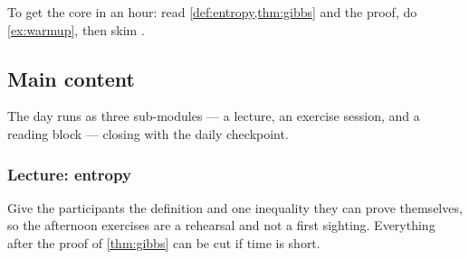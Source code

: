 \documentclass[11pt]{article}
\begin{document}
To get the core in an hour: read \cref{def:entropy,thm:gibbs} and the proof,
do \cref{ex:warmup}, then skim \cite[ch.~4]{MacKay:03}.

\subsection{Main content}
\label{sec:main}
%

The day runs as three sub-modules — a lecture, an exercise session, and a
reading block — closing with the daily checkpoint.

\subsubsection{Lecture: entropy}
\label{sec:lecture}

\begin{teachingnote}[Intent]
Give the participants the definition and one inequality they can prove
themselves, so the afternoon exercises are a rehearsal and not a first
sighting. Everything after the proof of \cref{thm:gibbs} can be cut if time is
short.
\end{teachingnote}
\end{document}

